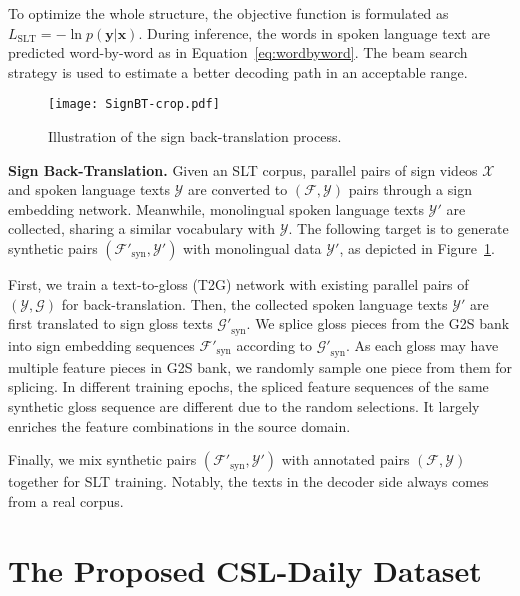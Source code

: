 \documentclass[final]{cvpr}
\begin{document}
To optimize the whole structure, the objective function is formulated as $L_{\text{SLT}} = -\ln p(\mathbf{y}|\mathbf{x})$. 
During inference, the words in spoken language text are predicted word-by-word as in Equation~\ref{eq:wordbyword}. 
The beam search~\cite{googletranslation} strategy is used to estimate a better decoding path in an acceptable range. 



\begin{figure}[tp]
   \centering
   \texttt{[image: SignBT-crop.pdf]}
   \caption{Illustration of the sign back-translation process. 
   }\label{fig:SignBT}
\vspace{-8pt}
\end{figure}

\textbf{Sign Back-Translation.}
Given an SLT corpus, parallel pairs of sign videos $\mathcal{X}$ and spoken language texts $\mathcal{Y}$ 
are converted to $(\mathcal{F}, \mathcal{Y})$ pairs through a sign embedding network. 
Meanwhile, monolingual spoken language texts $\mathcal{Y'}$ are collected, sharing a similar vocabulary with $\mathcal{Y}$. 
The following target is to generate synthetic pairs $(\mathcal{F'}_\text{syn}, \mathcal{Y'})$ with monolingual data $\mathcal{Y'}$, as depicted in Figure~\ref{fig:SignBT}. 

First, we train a text-to-gloss (T2G) network with existing parallel pairs of $(\mathcal{Y}, \mathcal{G})$ for back-translation. 
Then, the collected spoken language texts $\mathcal{Y'}$ are first translated to sign gloss texts $\mathcal{G'}_\text{syn}$. 
We splice gloss pieces from the G2S bank into sign embedding sequences $\mathcal{F'}_\text{syn}$ according to $\mathcal{G'}_\text{syn}$. 
As each gloss may have multiple feature pieces in G2S bank, we randomly sample one piece from them for splicing. 
In different training epochs, the spliced feature sequences of the same synthetic gloss sequence are different due to the random selections.
It largely enriches the feature combinations in the source domain. 

Finally, we mix synthetic pairs $(\mathcal{F'}_\text{syn}, \mathcal{Y'})$ with annotated pairs $(\mathcal{F}, \mathcal{Y})$ together for SLT training. Notably, the texts in the decoder side always comes from a real corpus. 



\section{The Proposed CSL-Daily Dataset} \label{sec:CSL-Daily}
\end{document}
